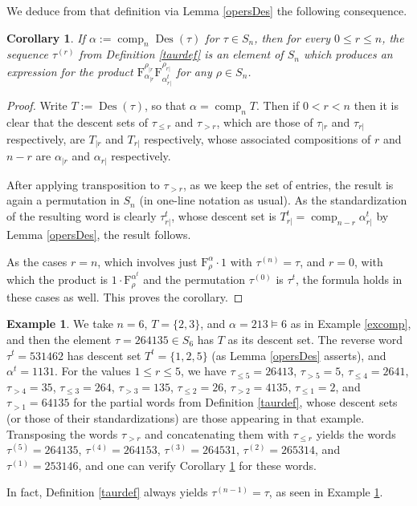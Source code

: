 \documentclass{article}
\newtheorem{cor}[thm]{Corollary}
\theoremstyle{definition}
\newtheorem{ex}[thm]{Example}
\begin{document}
We deduce from that definition via Lemma \ref{opersDes} the following consequence.
\begin{cor}
If $\alpha:=\operatorname{comp}_{n}\operatorname{Des}(\tau)$ for $\tau \in S_{n}$, then for every $0 \leq r \leq n$, the sequence $\tau^{(r)}$ from Definition \ref{taurdef} is an element of $S_{n}$ which produces an expression for the product $\mathrm{F}_{\alpha_{|r}}^{\rho_{|r}}\mathrm{F}_{\alpha_{r|}^{t}}^{\rho_{r|}}$ for any $\rho \in S_{n}$. \label{tauforr}
\end{cor}

\begin{proof}
Write $T:=\operatorname{Des}(\tau)$, so that $\alpha=\operatorname{comp}_{n}T$. Then if $0<r<n$ then it is clear that the descent sets of $\tau_{\leq r}$ and $\tau_{>r}$, which are those of $\tau_{|r}$ and $\tau_{r|}$ respectively, are $T_{|r}$ and $T_{r|}$ respectively, whose associated compositions of $r$ and $n-r$ are $\alpha_{|r}$ and $\alpha_{r|}$ respectively.

After applying transposition to $\tau_{>r}$, as we keep the set of entries, the result is again a permutation in $S_{n}$ (in one-line notation as usual). As the standardization of the resulting word is clearly $\tau_{r|}^{t}$, whose descent set is $T_{r|}^{t}=\operatorname{comp}_{n-r}\alpha_{r|}^{t}$ by Lemma \ref{opersDes}, the result follows.

As the cases $r=n$, which involves just $\mathrm{F}_{\rho}^{\alpha}\cdot1$ with $\tau^{(n)}=\tau$, and $r=0$, with which the product is $1\cdot\mathrm{F}_{\rho}^{\alpha^{t}}$ and the permutation $\tau^{(0)}$ is $\tau^{t}$, the formula holds in these cases as well. This proves the corollary.
\end{proof}

\begin{ex}
We take $n=6$, $T=\{2,3\}$, and $\alpha=213\vDash6$ as in Example \ref{excomp}, and then the element $\tau=264135 \in S_{6}$ has $T$ as its descent set. The reverse word $\tau^{t}=531462$ has descent set $T^{t}=\{1,2,5\}$ (as Lemma \ref{opersDes} asserts), and $\alpha^{t}=1131$. For the values $1 \leq r\leq5$, we have $\tau_{\leq5}=26413$, $\tau_{>5}=5$, $\tau_{\leq4}=2641$, $\tau_{>4}=35$, $\tau_{\leq3}=264$, $\tau_{>3}=135$, $\tau_{\leq2}=26$, $\tau_{>2}=4135$, $\tau_{\leq1}=2$, and $\tau_{>1}=64135$ for the partial words from Definition \ref{taurdef}, whose descent sets (or those of their standardizations) are those appearing in that example. Transposing the words $\tau_{>r}$ and concatenating them with $\tau_{\leq r}$ yields the words $\tau^{(5)}=264135$, $\tau^{(4)}=264153$, $\tau^{(3)}=264531$, $\tau^{(2)}=265314$,  and $\tau^{(1)}=253146$, and one can verify Corollary \ref{tauforr} for these words. \label{extaur}
\end{ex}
In fact, Definition \ref{taurdef} always yields $\tau^{(n-1)}=\tau$, as seen in Example \ref{extaur}.
\end{document}
